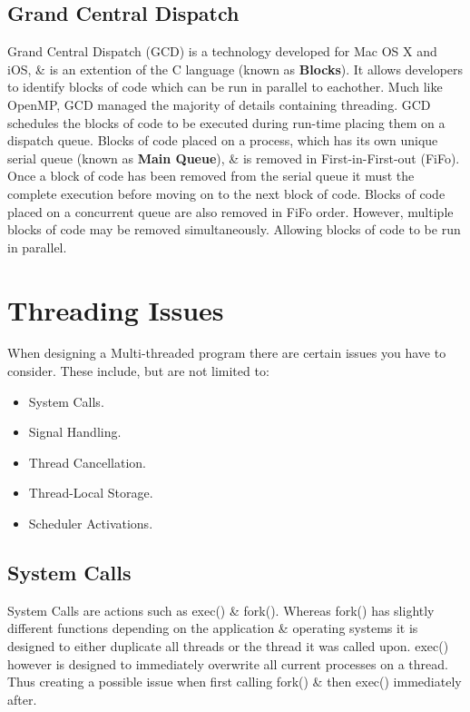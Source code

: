 \documentclass[a4paper,11pt]{article}
\begin{document}
\subsection{Grand Central Dispatch}
Grand Central Dispatch (GCD) is a technology developed for Mac OS X and iOS, \& is an extention of the C language (known as \textbf{Blocks}). It allows developers to identify blocks of code which can be run in parallel to eachother. Much like OpenMP, GCD managed the majority of details containing threading. GCD schedules the blocks of code to be executed during run-time placing them on a dispatch queue.
\newline\indent Blocks of code placed on a process, which has its own unique serial queue (known as \textbf{Main Queue}), \& is removed in First-in-First-out (FiFo). Once a block of code has been removed from the serial queue it must the complete execution before moving on to the next block of code.
\newline\indent Blocks of code placed on a concurrent queue are also removed in FiFo order. However, multiple blocks of code may be removed simultaneously. Allowing blocks of code to be run in parallel.\cite{Operatingsystemconcepts}
\newpage\section{Threading Issues}
When designing a Multi-threaded program there are certain issues you have to consider. These include, but are not limited to:
\begin{itemize}
    \item System Calls.
    \item Signal Handling.
    \item Thread Cancellation.
    \item Thread-Local Storage.
    \item Scheduler Activations.
\end{itemize}
\subsection{System Calls}
System Calls are actions such as exec() \& fork(). Whereas fork() has slightly different functions depending on the application \& operating systems it is designed to either duplicate all threads or the thread it was called upon. exec() however is designed to immediately overwrite all current processes on a thread. Thus creating a possible issue when first calling fork() \& then exec() immediately after.\cite{Operatingsystemconcepts}
\end{document}

